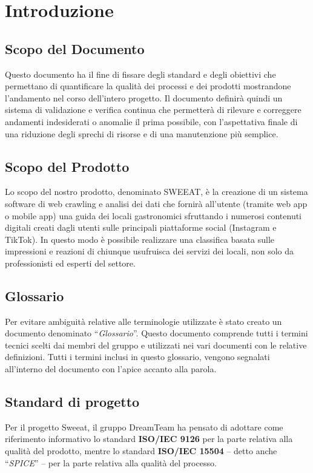 \section{Introduzione}

\subsection{Scopo del Documento}
Questo documento ha il fine di fissare degli standard e degli obiettivi che permettano di quantificare la qualità dei processi e dei prodotti mostrandone l’andamento nel corso dell’intero progetto.
Il documento definirà quindi un sistema di validazione e verifica continua che permetterà di rilevare e correggere andamenti indesiderati o anomalie il prima possibile, con l'aspettativa finale di una riduzione degli sprechi di risorse e di una manutenzione più semplice.

\subsection{Scopo del Prodotto}

Lo scopo del nostro prodotto, denominato SWEEAT, è la creazione di un sistema software di web crawling e analisi dei dati che fornirà all'utente (tramite web app o mobile app) una guida dei locali gastronomici sfruttando i numerosi contenuti digitali creati dagli utenti sulle principali piattaforme social (Instagram e TikTok). In questo modo è possibile realizzare una classifica basata sulle impressioni e reazioni di chiunque usufruisca dei servizi dei locali, non solo da professionisti ed esperti del settore.

\subsection{Glossario}

Per evitare ambiguità relative alle terminologie utilizzate è stato creato un documento denominato “\textit{Glossario}”. Questo documento comprende tutti i termini tecnici scelti dai membri del gruppo e utilizzati nei vari documenti con le relative definizioni. Tutti i termini inclusi in questo glossario, vengono segnalati all’interno del documento con l’apice \glo{} accanto alla parola.

\subsection{Standard di progetto}
Per il progetto Sweeat, il gruppo DreamTeam ha pensato di adottare come riferimento informativo lo standard \textbf{ISO/IEC 9126} per la parte relativa alla qualità del prodotto, mentre lo standard \textbf{ISO/IEC 15504} – detto anche “\textit{SPICE}” – per la parte relativa alla qualità del processo.

